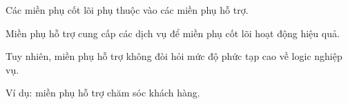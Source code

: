 Các miền phụ cốt lõi phụ thuộc vào các miền phụ hỗ trợ.

Miền phụ hỗ trợ cung cấp các dịch vụ để miền phụ cốt lõi hoạt động hiệu quả.

Tuy nhiên, miền phụ hỗ trợ không đòi hỏi mức độ phức tạp cao về logic nghiệp vụ.

Ví dụ: miền phụ hỗ trợ chăm sóc khách hàng.